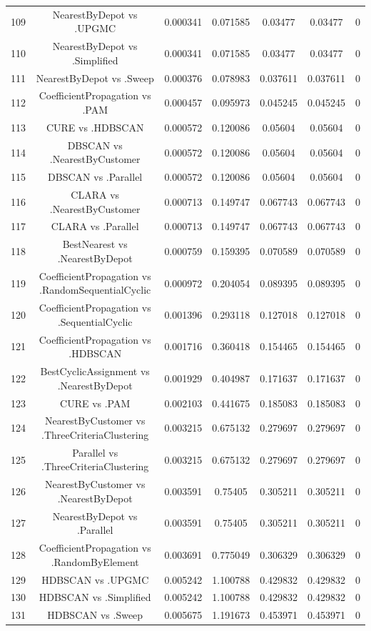 \documentclass[a4paper,10pt]{article}
\begin{document}
\begin{landscape}
\begin{table}[!htp]
\begin{tabular}{ccccccc}
109&NearestByDepot vs .UPGMC&0.000341&0.071585&0.03477&0.03477&0\\
110&NearestByDepot vs .Simplified&0.000341&0.071585&0.03477&0.03477&0\\
111&NearestByDepot vs .Sweep&0.000376&0.078983&0.037611&0.037611&0\\
112&CoefficientPropagation vs .PAM&0.000457&0.095973&0.045245&0.045245&0\\
113&CURE vs .HDBSCAN&0.000572&0.120086&0.05604&0.05604&0\\
114&DBSCAN vs .NearestByCustomer&0.000572&0.120086&0.05604&0.05604&0\\
115&DBSCAN vs .Parallel&0.000572&0.120086&0.05604&0.05604&0\\
116&CLARA vs .NearestByCustomer&0.000713&0.149747&0.067743&0.067743&0\\
117&CLARA vs .Parallel&0.000713&0.149747&0.067743&0.067743&0\\
118&BestNearest vs .NearestByDepot&0.000759&0.159395&0.070589&0.070589&0\\
119&CoefficientPropagation vs .RandomSequentialCyclic&0.000972&0.204054&0.089395&0.089395&0\\
120&CoefficientPropagation vs .SequentialCyclic&0.001396&0.293118&0.127018&0.127018&0\\
121&CoefficientPropagation vs .HDBSCAN&0.001716&0.360418&0.154465&0.154465&0\\
122&BestCyclicAssignment vs .NearestByDepot&0.001929&0.404987&0.171637&0.171637&0\\
123&CURE vs .PAM&0.002103&0.441675&0.185083&0.185083&0\\
124&NearestByCustomer vs .ThreeCriteriaClustering&0.003215&0.675132&0.279697&0.279697&0\\
125&Parallel vs .ThreeCriteriaClustering&0.003215&0.675132&0.279697&0.279697&0\\
126&NearestByCustomer vs .NearestByDepot&0.003591&0.75405&0.305211&0.305211&0\\
127&NearestByDepot vs .Parallel&0.003591&0.75405&0.305211&0.305211&0\\
128&CoefficientPropagation vs .RandomByElement&0.003691&0.775049&0.306329&0.306329&0\\
129&HDBSCAN vs .UPGMC&0.005242&1.100788&0.429832&0.429832&0\\
130&HDBSCAN vs .Simplified&0.005242&1.100788&0.429832&0.429832&0\\
131&HDBSCAN vs .Sweep&0.005675&1.191673&0.453971&0.453971&0\\

\end{tabular}
\end{table}
\end{landscape}
\end{document}
